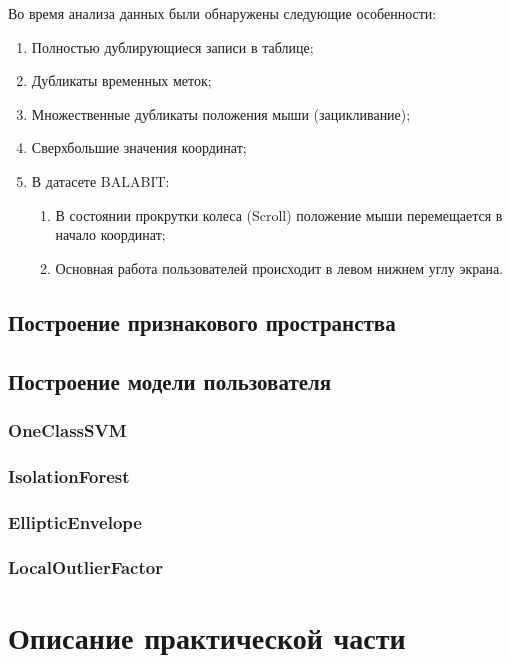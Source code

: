 \documentclass[12pt]{article}
\begin{document}
    Во время анализа данных были обнаружены следующие особенности:
    \begin{enumerate}
        \item Полностью дублирующиеся записи в таблице;
        \item Дубликаты временных меток;
        \item Множественные дубликаты положения мыши (зацикливание);
        \item Сверхбольшие значения координат;
        \item В датасете BALABIT:
        \begin{enumerate}
            \item В состоянии прокрутки колеса (Scroll) положение мыши перемещается в начало координат;
            \item Основная работа пользователей происходит в левом нижнем углу экрана.
        \end{enumerate}
    \end{enumerate}

    
    \subsection{Построение признакового пространства}
    
    \subsection{Построение модели пользователя}
    \subsubsection{OneClassSVM}
    \subsubsection{IsolationForest}
    \subsubsection{EllipticEnvelope}
    \subsubsection{LocalOutlierFactor}

    \newpage



    \section{Описание практической части}
    \label{sec:PracticalPart}
\end{document}
